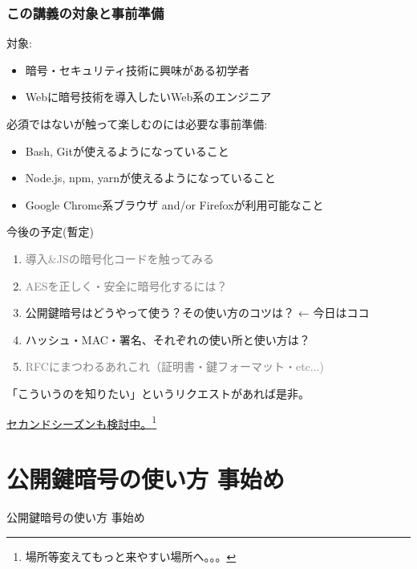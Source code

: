 \documentclass[12pt,dvipdfmx]{beamer}
\begin{document}
\begin{frame}
\frametitle{この講義の対象と事前準備}
対象:
\begin{itemize}
\item 暗号・セキュリティ技術に興味がある初学者
\item Webに暗号技術を導入したいWeb系のエンジニア
\end{itemize}

\vspace{2ex}

必須ではないが触って楽しむのには必要な事前準備:
\begin{itemize}
\item Bash, Gitが使えるようになっていること
\item Node.js, npm, yarnが使えるようになっていること
\item Google Chrome系ブラウザ and/or Firefoxが利用可能なこと
\end{itemize}
\end{frame}

\begin{frame}
今後の予定(暫定)
\begin{enumerate}
 \item \textcolor{gray}{導入\&JSの暗号化コードを触ってみる}
 \item \textcolor{gray}{AESを正しく・安全に暗号化するには？}
 \item \alert{公開鍵暗号はどうやって使う？その使い方のコツは？} ← 今日はココ
 \item ハッシュ・MAC・署名、それぞれの使い所と使い方は？
 \item \textcolor{gray}{RFCにまつわるあれこれ（証明書・鍵フォーマット・etc...)}
\end{enumerate}
「こういうのを知りたい」というリクエストがあれば是非。

\vspace{2ex}

\underline{セカンドシーズンも検討中。}\footnote[frame]{場所等変えてもっと来やすい場所へ。。。}
\end{frame}


\section{公開鍵暗号の使い方 事始め}
\begin{frame}
\centering
{\Large 公開鍵暗号の使い方 事始め}
\end{frame}
\end{document}
